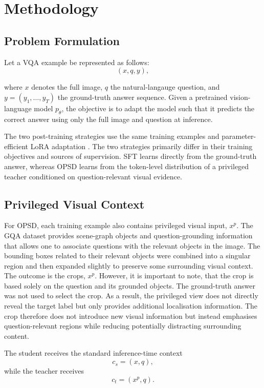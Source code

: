 \section{Methodology}\label{methodology}

\subsection{Problem Formulation}

Let a VQA example be represented as follows:
\[(x,q,y),\]

where $x$ denotes the full image, $q$ the natural-langauge question, and $y=(y_1,\ldots,y_T)$ the 
ground-truth answer sequence. Given a pretrained vision-language model $p_\theta$, the objective
is to adapt the model such that it predicts the correct answer using only the full image and question
at inference.

The two post-training strategies use the same training examples and parameter-efficient
LoRA adaptation \parencite{hu2021lora}. The two strategies primarily differ in their
training objectives and sources of supervision. SFT learns directly from
the ground-truth answer, whereas OPSD learns from the token-level distribution of a privileged teacher
conditioned on question-relevant visual evidence.

\subsection{Privileged Visual Context}

For OPSD, each training example also contains privileged visual input, $x^{p}$. The
GQA dataset provides scene-graph objects and question-grounding information that allows one
to associate questions with the relevant objects in the image. The bounding boxes related to their
relevant objects were combined into a singular region and then expanded slightly to preserve
some surrounding visual context. The outcome is the crops, $x^{p}$. However, it is important to note,
that the crop is based solely on the question and its grounded objects. The ground-truth answer
was not used to select the crop. As a result, the privileged view does not directly reveal the
target label but only provides additional localisation information. The crop therefore does not 
introduce new visual information but instead emphasises question-relevant regions while reducing 
potentially distracting surrounding content.

The student receives the standard inference-time context
\[c_s = (x,q),\]
while the teacher receives
\[c_t = (x^{p},q).\]

